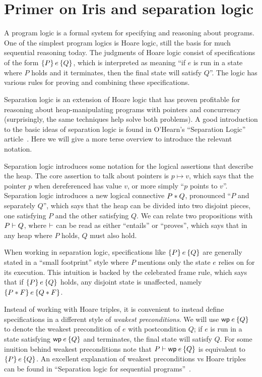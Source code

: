 \section{Primer on Iris and separation logic}

A program logic is a formal system for specifying and reasoning about programs.
One of the simplest program logics is Hoare logic, still the basis for much
sequential reasoning today. The judgments of Hoare logic consist of
specifications of the form $\hoare{P}{e}{Q}$, which is interpreted as meaning
``if $e$ is run in a state where $P$ holds and it terminates, then the final
state will satisfy $Q$''. The logic has various rules for proving and combining
these specifications.

Separation logic is an extension of Hoare logic that has proven profitable for
reasoning about heap-manipulating programs with pointers and concurrency
(surprisingly, the same techniques help solve both problems). A good
introduction to the basic ideas of separation logic is found in O'Hearn's
``Separation Logic'' article~\cite{ohearn:seplogic}. Here we will give a more
terse overview to introduce the relevant notation.

Separation logic introduces some notation for the logical assertions that
describe the heap. The core assertion to talk about pointers is $p \mapsto v$,
which says that the pointer $p$ when dereferenced has value $v$, or more simply
``$p$ points to $v$''. Separation logic introduces a new logical connective
$P * Q$, pronounced ``$P$ and separately $Q$'', which says that the heap can
be divided into two disjoint pieces, one satisfying $P$ and the other satisfying
$Q$. We can relate two propositions with $P \vdash Q$, where $\vdash$ can be
read as either ``entails'' or ``proves'', which says that in any heap where $P$
holds, $Q$ must also hold.

When working in separation logic, specifications like $\hoare{P}{e}{Q}$ are
generally stated in a ``small footprint'' style where $P$ mentions only the
state $e$ relies on for its execution. This intuition is backed by the
celebrated frame rule, which says that if $\hoare{P}{e}{Q}$ holds, any disjoint
state is unaffected, namely $\hoare{P \sep F}{e}{Q \sep F}$.

Instead of working with Hoare triples, it is convenient to instead define
specifications in a different style of \emph{weakest preconditions}. We will use
$\wpre{e}{Q}$ to denote the weakest precondition of $e$ with postcondition $Q$;
if $e$ is run in a state satisfying $\wpre{e}{Q}$ and terminates, the final
state will satisfy $Q$. For some inuition behind weakest preconditions note that
$P \proves \wpre{e}{Q}$ is equivalent to $\hoare{P}{e}{Q}$. An excellent
explanation of weakest preconditions vs Hoare triples can be found in
``Separation logic for sequential programs''~\cite{chargueraud:seq-seplogic}.

